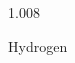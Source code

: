 \documentclass[12pt]{article}
\begin{document}
\hfill{}
\vfill
\begin{center}
  {\fontsize{50}{60}
  }

  1.008

Hydrogen
\end{center}
\vfill
\end{document}
